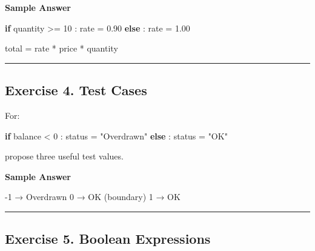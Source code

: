 \documentclass[
  11pt,
  a4paper,
]{article}
\newenvironment{Shaded}{}{}
\newcommand{\ControlFlowTok}[1]{\textcolor[rgb]{0.00,0.44,0.13}{\textbf{#1}}}
\newcommand{\DecValTok}[1]{\textcolor[rgb]{0.25,0.63,0.44}{#1}}
\newcommand{\FloatTok}[1]{\textcolor[rgb]{0.25,0.63,0.44}{#1}}
\newcommand{\NormalTok}[1]{#1}
\newcommand{\OperatorTok}[1]{\textcolor[rgb]{0.40,0.40,0.40}{#1}}
\newcommand{\StringTok}[1]{\textcolor[rgb]{0.25,0.44,0.63}{#1}}
\begin{document}
\textbf{Sample Answer}

\begin{Shaded}
\begin{Highlighting}[]
\ControlFlowTok{if}\NormalTok{ quantity }\OperatorTok{\textgreater{}=} \DecValTok{10}\NormalTok{ :}
\NormalTok{    rate }\OperatorTok{=} \FloatTok{0.90}
\ControlFlowTok{else}\NormalTok{ :}
\NormalTok{    rate }\OperatorTok{=} \FloatTok{1.00}

\NormalTok{total }\OperatorTok{=}\NormalTok{ rate }\OperatorTok{*}\NormalTok{ price }\OperatorTok{*}\NormalTok{ quantity}
\end{Highlighting}
\end{Shaded}

\begin{center}\rule{0.5\linewidth}{0.5pt}\end{center}

\subsection{Exercise 4. Test Cases}\label{exercise-4.-test-cases}

For:

\begin{Shaded}
\begin{Highlighting}[]
\ControlFlowTok{if}\NormalTok{ balance }\OperatorTok{\textless{}} \DecValTok{0}\NormalTok{ :}
\NormalTok{    status }\OperatorTok{=} \StringTok{"Overdrawn"}
\ControlFlowTok{else}\NormalTok{ :}
\NormalTok{    status }\OperatorTok{=} \StringTok{"OK"}
\end{Highlighting}
\end{Shaded}

propose three useful test values.

\textbf{Sample Answer}

\begin{Shaded}
\begin{Highlighting}[]
\NormalTok{{-}1   → Overdrawn}
\NormalTok{0    → OK       (boundary)}
\NormalTok{1    → OK}
\end{Highlighting}
\end{Shaded}

\begin{center}\rule{0.5\linewidth}{0.5pt}\end{center}

\subsection{Exercise 5. Boolean
Expressions}\label{exercise-5.-boolean-expressions}
\end{document}
